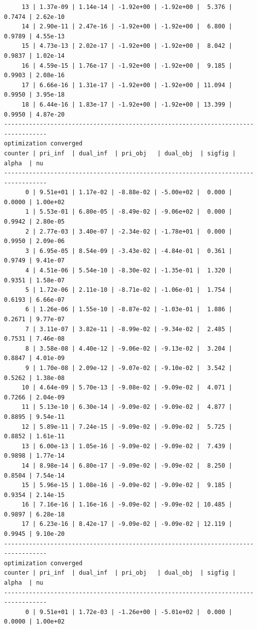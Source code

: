 \documentclass[
]{book}
\begin{document}
\begin{verbatim}
     13 | 1.37e-09 | 1.14e-14 | -1.92e+00 | -1.92e+00 |  5.376 | 0.7474 | 2.62e-10
     14 | 2.90e-11 | 2.47e-16 | -1.92e+00 | -1.92e+00 |  6.800 | 0.9789 | 4.55e-13
     15 | 4.73e-13 | 2.02e-17 | -1.92e+00 | -1.92e+00 |  8.042 | 0.9837 | 1.02e-14
     16 | 4.59e-15 | 1.76e-17 | -1.92e+00 | -1.92e+00 |  9.185 | 0.9903 | 2.08e-16
     17 | 6.66e-16 | 1.31e-17 | -1.92e+00 | -1.92e+00 | 11.094 | 0.9950 | 3.95e-18
     18 | 6.44e-16 | 1.83e-17 | -1.92e+00 | -1.92e+00 | 13.399 | 0.9950 | 4.87e-20
----------------------------------------------------------------------------------
optimization converged
counter | pri_inf  | dual_inf  | pri_obj   | dual_obj  | sigfig | alpha  | nu 
----------------------------------------------------------------------------------
      0 | 9.51e+01 | 1.17e-02 | -8.88e-02 | -5.00e+02 |  0.000 | 0.0000 | 1.00e+02
      1 | 5.53e-01 | 6.80e-05 | -8.49e-02 | -9.06e+02 |  0.000 | 0.9942 | 2.80e-05
      2 | 2.77e-03 | 3.40e-07 | -2.34e-02 | -1.78e+01 |  0.000 | 0.9950 | 2.09e-06
      3 | 6.95e-05 | 8.54e-09 | -3.43e-02 | -4.84e-01 |  0.361 | 0.9749 | 9.41e-07
      4 | 4.51e-06 | 5.54e-10 | -8.30e-02 | -1.35e-01 |  1.320 | 0.9351 | 1.58e-07
      5 | 1.72e-06 | 2.11e-10 | -8.71e-02 | -1.06e-01 |  1.754 | 0.6193 | 6.66e-07
      6 | 1.26e-06 | 1.55e-10 | -8.87e-02 | -1.03e-01 |  1.886 | 0.2671 | 9.77e-07
      7 | 3.11e-07 | 3.82e-11 | -8.99e-02 | -9.34e-02 |  2.485 | 0.7531 | 7.46e-08
      8 | 3.58e-08 | 4.40e-12 | -9.06e-02 | -9.13e-02 |  3.204 | 0.8847 | 4.01e-09
      9 | 1.70e-08 | 2.09e-12 | -9.07e-02 | -9.10e-02 |  3.542 | 0.5262 | 1.38e-08
     10 | 4.64e-09 | 5.70e-13 | -9.08e-02 | -9.09e-02 |  4.071 | 0.7266 | 2.04e-09
     11 | 5.13e-10 | 6.30e-14 | -9.09e-02 | -9.09e-02 |  4.877 | 0.8895 | 9.54e-11
     12 | 5.89e-11 | 7.24e-15 | -9.09e-02 | -9.09e-02 |  5.725 | 0.8852 | 1.61e-11
     13 | 6.00e-13 | 1.05e-16 | -9.09e-02 | -9.09e-02 |  7.439 | 0.9898 | 1.77e-14
     14 | 8.98e-14 | 6.80e-17 | -9.09e-02 | -9.09e-02 |  8.250 | 0.8504 | 7.54e-14
     15 | 5.96e-15 | 1.08e-16 | -9.09e-02 | -9.09e-02 |  9.185 | 0.9354 | 2.14e-15
     16 | 7.16e-16 | 1.16e-16 | -9.09e-02 | -9.09e-02 | 10.485 | 0.9897 | 6.28e-18
     17 | 6.23e-16 | 8.42e-17 | -9.09e-02 | -9.09e-02 | 12.119 | 0.9945 | 9.10e-20
----------------------------------------------------------------------------------
optimization converged
counter | pri_inf  | dual_inf  | pri_obj   | dual_obj  | sigfig | alpha  | nu 
----------------------------------------------------------------------------------
      0 | 9.51e+01 | 1.72e-03 | -1.26e+00 | -5.01e+02 |  0.000 | 0.0000 | 1.00e+02

\end{verbatim}
\end{document}
